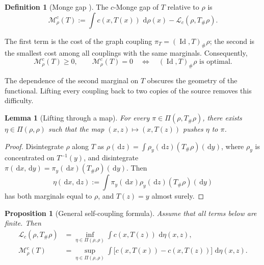 \documentclass[11pt,a4paper]{article}
\newtheorem{proposition}[theorem]{Proposition}
\newtheorem{lemma}[theorem]{Lemma}
\theoremstyle{definition}
\newtheorem{definition}[theorem]{Definition}
\theoremstyle{remark}
\newcommand{\Mcal}{\mathcal M}
\newcommand{\Lcal}{\mathcal L}
\newcommand{\Id}{\operatorname{Id}}
\newcommand{\dd}{\,\mathrm d}
\begin{document}
\begin{definition}[Monge gap \citealp{UsciddaCuturi2023}]
The $c$-Monge gap of $T$ relative to $\rho$ is
\begin{equation}\label{eq:general-monge-gap}
  \Mcal_\rho^c(T)
  :=\int c(x,T(x))\,\dd\rho(x)
    -\Lcal_c(\rho,T_\#\rho).
\end{equation}
\end{definition}

The first term is the cost of the graph coupling
$\pi_T=(\Id,T)_\#\rho$; the second is the smallest cost among all couplings
with the same marginals. Consequently,
\begin{equation}\label{eq:gap-zero-optimal}
  \Mcal_\rho^c(T)\geq0,
  \qquad
  \Mcal_\rho^c(T)=0
  \quad\Longleftrightarrow\quad
  (\Id,T)_\#\rho\text{ is optimal}.
\end{equation}

The dependence of the second marginal on $T$ obscures the geometry of the
functional. Lifting every coupling back to two copies of the source removes
this difficulty.

\begin{lemma}[Lifting through a map]\label{lem:coupling-lift}
For every $\pi\in\Pi(\rho,T_\#\rho)$, there exists
$\eta\in\Pi(\rho,\rho)$ such that the map $(x,z)\mapsto(x,T(z))$ pushes
$\eta$ to $\pi$.
\end{lemma}

\begin{proof}
Disintegrate $\rho$ along $T$ as
$\rho(\dd z)=\int\rho_y(\dd z)(T_\#\rho)(\dd y)$, where $\rho_y$ is
concentrated on $T^{-1}(y)$, and disintegrate
$\pi(\dd x,\dd y)=\pi_y(\dd x)(T_\#\rho)(\dd y)$. Then
\[
  \eta(\dd x,\dd z)
  :=\int \pi_y(\dd x)\rho_y(\dd z)(T_\#\rho)(\dd y)
\]
has both marginals equal to $\rho$, and $T(z)=y$ almost surely.
\end{proof}

\begin{proposition}[General self-coupling formula]\label{prop:general-self-coupling}
Assume that all terms below are finite. Then
\begin{align}
  \Lcal_c(\rho,T_\#\rho)
  &=\inf_{\eta\in\Pi(\rho,\rho)}
      \int c(x,T(z))\,\dd\eta(x,z),\label{eq:lifted-transport}\\
  \Mcal_\rho^c(T)
  &=\sup_{\eta\in\Pi(\rho,\rho)}
      \int\bigl[c(x,T(x))-c(x,T(z))\bigr]\,\dd\eta(x,z).
      \label{eq:general-self-gap}
\end{align}
\end{proposition}
\end{document}

